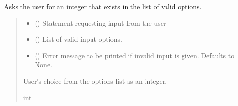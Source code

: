 \documentclass[letterpaper,10pt,english]{sphinxmanual}
\begin{document}
\begin{fulllineitems}
\begin{fulllineitems}
\label{\detokenize{Setup.Inputs:Setup.Inputs.GetUserInput.UserInput.AskForIntInList}}
\pysigstartsignatures
{}
\pysigstopsignatures
\sphinxAtStartPar
Asks the user for an integer that exists in the list of valid options.
\begin{quote}\begin{description}
\begin{itemize}
\item {} 
\sphinxAtStartPar
{} () \textendash{} Statement requesting input from the user

\item {} 
\sphinxAtStartPar
{} () \textendash{} List of valid input options.

\item {} 
\sphinxAtStartPar
{} (\sphinxstyleliteralemphasis{\sphinxupquote{ | }}\sphinxstyleliteralemphasis{\sphinxupquote{, }}) \textendash{} Error message to be printed if invalid input is given.                 Defaults to None.

\end{itemize}

\sphinxAtStartPar
User’s choice from the options list as an integer.

\sphinxAtStartPar
int

\end{description}\end{quote}

\end{fulllineitems}


\end{fulllineitems}
\end{document}
